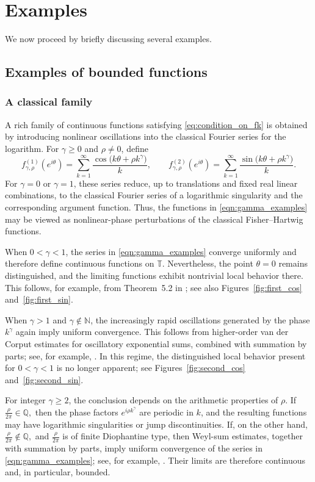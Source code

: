 \documentclass[11pt]{amsart}
\theoremstyle{plain}
\theoremstyle{remark}
\numberwithin{equation}{section}
\begin{document}
\section{Examples} \label{subsec:examples}
We now proceed by briefly discussing several examples.
\subsection{Examples of bounded functions}
\subsubsection{A classical family}
A rich family of continuous functions satisfying \eqref{eq:condition_on_fk} is obtained by introducing nonlinear oscillations into the classical Fourier series for the logarithm. For $\gamma \geq 0$ and $\rho \neq 0$, define \begin{equation}\label{eqn:gamma_examples} f_{\gamma,\rho}^{(1)}(e^{i\theta}) = \sum_{k=1}^{\infty} \frac{\cos\bigl(k\theta+\rho k^{\gamma}\bigr)}{k}, \qquad f_{\gamma,\rho}^{(2)}(e^{i\theta}) = \sum_{k=1}^{\infty} \frac{\sin\bigl(k\theta+\rho k^{\gamma}\bigr)}{k}. \end{equation} For $\gamma=0$ or $\gamma=1$, these series reduce, up to translations and fixed real linear combinations, to the classical Fourier series of a logarithmic singularity and the corresponding argument function. Thus, the functions in \eqref{eqn:gamma_examples} may be viewed as nonlinear-phase perturbations of the classical Fisher--Hartwig functions. 

When $0<\gamma<1$, the series in \eqref{eqn:gamma_examples} converge uniformly and therefore define continuous functions on $\mathbb{T}$. Nevertheless, the point $\theta=0$ remains distinguished, and the limiting functions exhibit nontrivial local behavior there. This follows, for example, from Theorem~5.2 in \cite{Zyg}; see also Figures~\ref{fig:first_cos} and~\ref{fig:first_sin}. 

When $\gamma>1$ and $\gamma\notin\mathbb{N}$, the increasingly rapid oscillations generated by the phase $k^\gamma$ again imply uniform convergence. This follows from higher-order van der Corput estimates for oscillatory exponential sums, combined with summation by parts; see, for example, \cite[Chapter~3]{MontgomeryTenLectures}. In this regime, the distinguished local behavior present for $0<\gamma<1$ is no longer apparent; see Figures~\ref{fig:second_cos} and~\ref{fig:second_sin}.

For integer $\gamma\geq 2$, the conclusion depends on the arithmetic properties of $\rho$. If $\frac{\rho}{2\pi}\in\mathbb{Q},$ then the phase factors $e^{i\rho k^\gamma}$ are periodic in $k$, and the resulting functions may have logarithmic singularities or jump discontinuities. If, on the other hand, $\frac{\rho}{2\pi}\notin\mathbb{Q},$  and $\frac{\rho}{2\pi}$ is of finite Diophantine type, then Weyl-sum estimates, together with summation by parts, imply uniform convergence of the series in \eqref{eqn:gamma_examples}; see, for example, \cite[Chapter~3]{MontgomeryTenLectures}. Their limits are therefore continuous and, in particular, bounded. 
\end{document}
